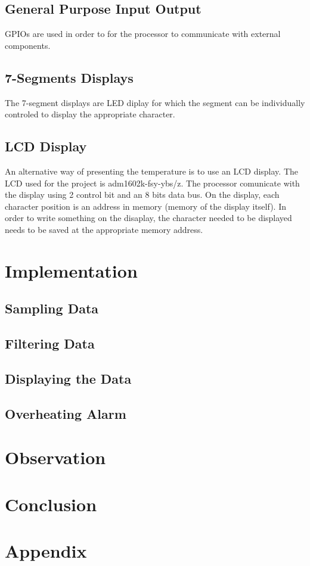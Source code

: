 \documentclass[12pt]{article}
\begin{document}
\subsection{General Purpose Input Output}
GPIOs are used in order to for the processor to communicate with external components. 

\subsection{7-Segments Displays}
The 7-segment displays are LED diplay for which the segment can be individually controled to display the appropriate character.

\subsection{LCD Display}
An alternative way of presenting the temperature is to use an LCD display. The LCD used for the project is adm1602k-fsy-ybs/z. The processor comunicate with the display using 2 control bit and an 8 bits data bus. On the display, each character position is an address in memory (memory of the display itself). In order to write something on the disaplay, the character needed to be displayed needs to be saved at the appropriate memory address.


\section{Implementation}
\subsection{Sampling Data}

\subsection{Filtering Data}

\subsection{Displaying the Data}

\subsection{Overheating Alarm}


\section{Observation}

\section{Conclusion}
\newpage

\section{Appendix}
\end{document}

